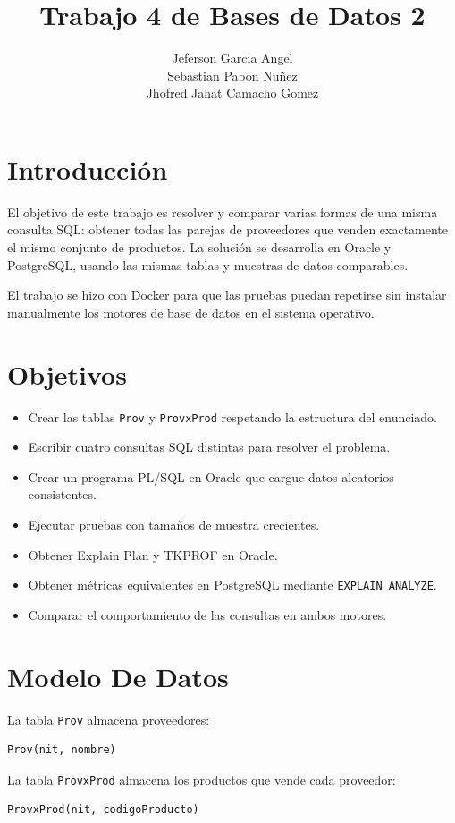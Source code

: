 \documentclass[12pt,a4paper]{article}
\title{Trabajo 4 de Bases de Datos 2}
\author{Jeferson Garcia Angel \\ Sebastian Pabon Nu\~{n}ez \\ Jhofred Jahat Camacho Gomez}
\date{}
\begin{document}
\maketitle

\section{Introducción}
El objetivo de este trabajo es resolver y comparar varias formas de una misma consulta SQL: obtener todas las parejas de proveedores que venden exactamente el mismo conjunto de productos. La solución se desarrolla en Oracle y PostgreSQL, usando las mismas tablas y muestras de datos comparables.

El trabajo se hizo con Docker para que las pruebas puedan repetirse sin instalar manualmente los motores de base de datos en el sistema operativo.

\section{Objetivos}
\begin{itemize}
    \item Crear las tablas \texttt{Prov} y \texttt{ProvxProd} respetando la estructura del enunciado.
    \item Escribir cuatro consultas SQL distintas para resolver el problema.
    \item Crear un programa PL/SQL en Oracle que cargue datos aleatorios consistentes.
    \item Ejecutar pruebas con tamaños de muestra crecientes.
    \item Obtener Explain Plan y TKPROF en Oracle.
    \item Obtener métricas equivalentes en PostgreSQL mediante \texttt{EXPLAIN ANALYZE}.
    \item Comparar el comportamiento de las consultas en ambos motores.
\end{itemize}

\section{Modelo De Datos}
La tabla \texttt{Prov} almacena proveedores:
\begin{lstlisting}[language=SQL]
Prov(nit, nombre)
\end{lstlisting}

La tabla \texttt{ProvxProd} almacena los productos que vende cada proveedor:
\begin{lstlisting}[language=SQL]
ProvxProd(nit, codigoProducto)
\end{lstlisting}
\end{document}
